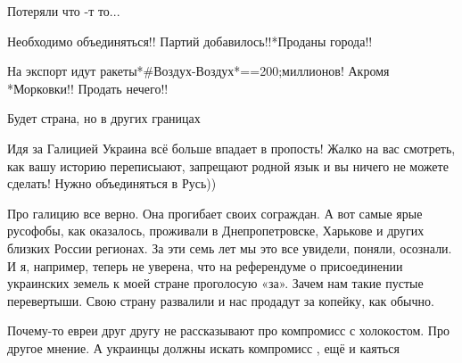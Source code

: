 \begin{itemize}
Потеряли что -т то...


Необходимо объединяться!! Партий добавилось!!*Проданы города!!

На экспорт идут ракеты*\#Воздух-Воздух*==200;миллионов! Акромя *Морковки!!
Продать нечего!!

 
Будет страна, но в других границах


Идя за Галицией Украина всё больше впадает в пропость! Жалко на вас смотреть,
как вашу историю переписыают, запрещают родной язык и вы ничего не можете
сделать! Нужно объединяться в Русь))


Про галицию все верно. Она прогибает своих сограждан. А вот самые ярые
русофобы, как оказалось, проживали в Днепропетровске, Харькове и других близких
России регионах. За эти семь лет мы это все увидели, поняли, осознали. И я,
например, теперь не уверена, что на референдуме о присоединении украинских
земель к моей стране проголосую «за». Зачем нам такие пустые перевертыши. Свою
страну развалили и нас продадут за копейку, как обычно.
\end{itemize}

 
Почему-то евреи друг другу не рассказывают про компромисс с холокостом. Про другое мнение. А украинцы должны искать компромисс , ещё и каяться

 
